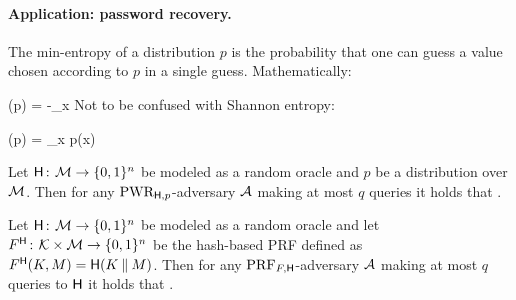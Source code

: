 \paragraph{Application: password recovery.}
The min-entropy of a distribution $p$ is the probability that one can guess a
value chosen according to $p$ in a single guess. Mathematically:

\bnm
  \Hinfty(p) = -\max_{x} \log {}
\enm
Not to be confused with Shannon entropy:

\bnm
  \Hshan(p) =  \sum_x p(x) \log {}
\enm

\begin{theorem}
Let $\mathsf{H}{{\kern .05em}\colon{\kern .05em}}{\cal M}\rightarrow\{0,1\}^n$ be modeled as a random oracle
and $p$ be a distribution over ${\cal M}$.
Then for any $\textnormal{PWR}_{\mathsf{H},p}$-adversary ${\mathcal A}$ making at most $q$ queries 
it holds that
\bnm
   \le {} \;.
\enm
\end{theorem}





\begin{theorem}
Let  $\mathsf{H}{{\kern .05em}\colon{\kern .05em}}{\cal M}\rightarrow\{0,1\}^n$ be modeled as a random oracle
and let $F^{\mathsf{H}}{{\kern .05em}\colon{\kern .05em}}{\cal K}\times{\cal M}\rightarrow\{0,1\}^n$ be the
hash-based PRF defined as $F^{\mathsf{H}}(K,M) = \mathsf{H}(K \: \| \: M)$. 
Then for any $\textnormal{PRF}_{F,\mathsf{H}}$-adversary ${\mathcal A}$ making at most $q$ queries 
to $\mathsf{H}$ it holds that
\bnm
   \le {} \;.
\enm
\end{theorem}




